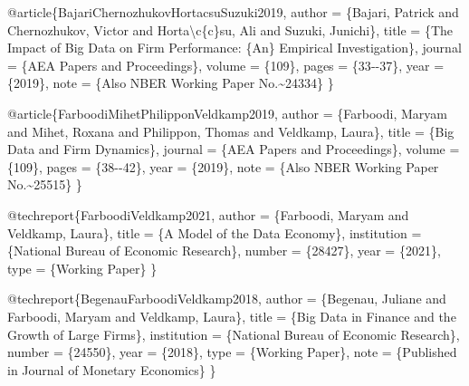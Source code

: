 \documentclass[
]{article}
\newenvironment{Shaded}{\begin{snugshade}}{\end{snugshade}}
\newcommand{\CharTok}[1]{\textcolor[rgb]{0.31,0.60,0.02}{#1}}
\newcommand{\DataTypeTok}[1]{\textcolor[rgb]{0.13,0.29,0.53}{#1}}
\newcommand{\NormalTok}[1]{#1}
\newcommand{\OtherTok}[1]{\textcolor[rgb]{0.56,0.35,0.01}{#1}}
\newcommand{\VariableTok}[1]{\textcolor[rgb]{0.00,0.00,0.00}{#1}}
\begin{document}
\begin{Shaded}
\begin{Highlighting}[]
\VariableTok{@article}\NormalTok{\{}\OtherTok{BajariChernozhukovHortacsuSuzuki2019}\NormalTok{,}
  \DataTypeTok{author}\NormalTok{  = \{Bajari, Patrick and Chernozhukov, Victor and Horta}\CharTok{\textbackslash{}c}\NormalTok{\{c\}su, Ali and Suzuki, Junichi\},}
  \DataTypeTok{title}\NormalTok{   = \{The Impact of Big Data on Firm Performance: \{An\} Empirical Investigation\},}
  \DataTypeTok{journal}\NormalTok{ = \{AEA Papers and Proceedings\},}
  \DataTypeTok{volume}\NormalTok{  = \{109\},}
  \DataTypeTok{pages}\NormalTok{   = \{33{-}{-}37\},}
  \DataTypeTok{year}\NormalTok{    = \{2019\},}
  \DataTypeTok{note}\NormalTok{    = \{Also NBER Working Paper No.\textasciitilde{}24334\}}
\NormalTok{\}}

\VariableTok{@article}\NormalTok{\{}\OtherTok{FarboodiMihetPhilipponVeldkamp2019}\NormalTok{,}
  \DataTypeTok{author}\NormalTok{  = \{Farboodi, Maryam and Mihet, Roxana and Philippon, Thomas and Veldkamp, Laura\},}
  \DataTypeTok{title}\NormalTok{   = \{Big Data and Firm Dynamics\},}
  \DataTypeTok{journal}\NormalTok{ = \{AEA Papers and Proceedings\},}
  \DataTypeTok{volume}\NormalTok{  = \{109\},}
  \DataTypeTok{pages}\NormalTok{   = \{38{-}{-}42\},}
  \DataTypeTok{year}\NormalTok{    = \{2019\},}
  \DataTypeTok{note}\NormalTok{    = \{Also NBER Working Paper No.\textasciitilde{}25515\}}
\NormalTok{\}}

\VariableTok{@techreport}\NormalTok{\{}\OtherTok{FarboodiVeldkamp2021}\NormalTok{,}
  \DataTypeTok{author}\NormalTok{      = \{Farboodi, Maryam and Veldkamp, Laura\},}
  \DataTypeTok{title}\NormalTok{       = \{A Model of the Data Economy\},}
  \DataTypeTok{institution}\NormalTok{ = \{National Bureau of Economic Research\},}
  \DataTypeTok{number}\NormalTok{      = \{28427\},}
  \DataTypeTok{year}\NormalTok{        = \{2021\},}
  \DataTypeTok{type}\NormalTok{        = \{Working Paper\}}
\NormalTok{\}}

\VariableTok{@techreport}\NormalTok{\{}\OtherTok{BegenauFarboodiVeldkamp2018}\NormalTok{,}
  \DataTypeTok{author}\NormalTok{      = \{Begenau, Juliane and Farboodi, Maryam and Veldkamp, Laura\},}
  \DataTypeTok{title}\NormalTok{       = \{Big Data in Finance and the Growth of Large Firms\},}
  \DataTypeTok{institution}\NormalTok{ = \{National Bureau of Economic Research\},}
  \DataTypeTok{number}\NormalTok{      = \{24550\},}
  \DataTypeTok{year}\NormalTok{        = \{2018\},}
  \DataTypeTok{type}\NormalTok{        = \{Working Paper\},}
  \DataTypeTok{note}\NormalTok{        = \{Published in Journal of Monetary Economics\}}
\NormalTok{\}}


\end{Highlighting}
\end{Shaded}
\end{document}
